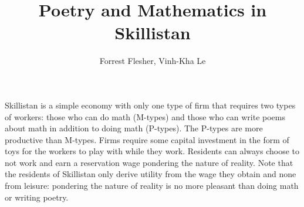 \documentclass[12pt]{article}
\title{Poetry and Mathematics in Skillistan}
\author{Forrest Flesher, Vinh-Kha Le}
\begin{document}
\maketitle



Skillistan is a simple economy with only one type of firm that requires two types of workers:
those who can do math (M-types) and those who can write poems about math in addition
to doing math (P-types). The P-types are more productive than M-types. Firms
require some capital investment in the form of toys for the workers to play with while they
work. Residents can always choose to not work and earn a reservation wage pondering the
nature of reality. Note that the residents of Skillistan only derive utility from the wage
they obtain and none from leisure: pondering the nature of reality is no more pleasant
than doing math or writing poetry.
\end{document}
